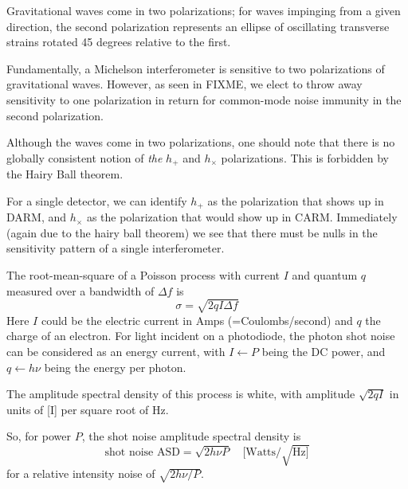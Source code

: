
Gravitational waves come in two polarizations; for waves impinging
from a given direction, the second polarization represents an ellipse
of oscillating transverse strains rotated 45 degrees relative to the
first.  

Fundamentally, a Michelson interferometer is sensitive to two
polarizations of gravitational waves.  However, as seen in FIXME, we
elect to throw away sensitivity to one polarization in return for
common-mode noise immunity in the second polarization.

Although the waves come in two polarizations, one should note that
there is no globally consistent notion of \emph{the} $h_+$ and
$h_\times$ polarizations.  This is forbidden by the Hairy Ball
theorem.  

For a single detector, we can identify $h_+$ as the polarization
that shows up in DARM, and $h_\times$ as the polarization that would
show up in CARM.  Immediately (again due to the hairy ball theorem) we
see that there must be nulls in the sensitivity pattern of a single
interferometer.

The root-mean-square of a Poisson process with current $I$ and quantum
$q$ measured over a bandwidth of $\Delta f$ is 
$$\sigma = \sqrt{2 q I \Delta f}$$ 
Here $I$ could be the electric current in Amps (=Coulombs/second) and
$q$ the charge of an electron.  For light incident on a photodiode,
the photon shot noise can be considered as an energy current, with
$I\leftarrow P$ being the DC power, and $q\leftarrow h\nu$ being the
energy per photon.

The amplitude spectral density of this process is white, with
amplitude $\sqrt{2qI}$ in units of [I] per square root of Hz.

So, for power $P$, the shot noise amplitude spectral density is 
\begin{equation}
\text{shot noise ASD} = \sqrt{2 h\nu P}\quad [\text{Watts}/\sqrt{\text{Hz}]}
\label{eq:shotnoise-asd}
\end{equation}
for a relative intensity noise of $\sqrt{2 h\nu/P}$.

\cite{Quetschke2007Complex}
